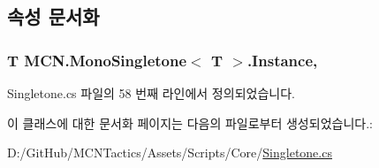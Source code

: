 \subsection{속성 문서화}
\subsubsection[{\texorpdfstring{Instance}{Instance}}]{\setlength{\rightskip}{0pt plus 5cm}T {\bf M\+C\+N.\+Mono\+Singletone}$<$ T $>$.Instance\hspace{0.3cm}{\ttfamily [static]}, {\ttfamily [get]}}\hypertarget{class_m_c_n_1_1_mono_singletone_aa50c027cca64cf4ad30c1ee5c83e0b78}{}\label{class_m_c_n_1_1_mono_singletone_aa50c027cca64cf4ad30c1ee5c83e0b78}


Singletone.\+cs 파일의 58 번째 라인에서 정의되었습니다.



이 클래스에 대한 문서화 페이지는 다음의 파일로부터 생성되었습니다.\+:\begin{DoxyCompactItemize}
\item 
D\+:/\+Git\+Hub/\+M\+C\+N\+Tactics/\+Assets/\+Scripts/\+Core/\hyperlink{_singletone_8cs}{Singletone.\+cs}\end{DoxyCompactItemize}
